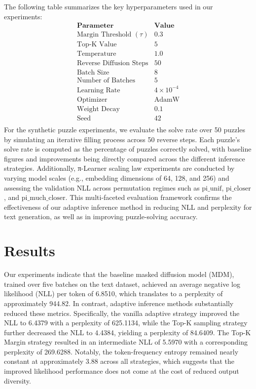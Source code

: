 \documentclass{article}
\begin{document}
The following table summarizes the key hyperparameters used in our experiments:
\[
\begin{array}{l|c}
\textbf{Parameter} & \textbf{Value} \\\hline
\text{Margin Threshold } (\tau) & 0.3 \\
\text{Top-K Value} & 5 \\
\text{Temperature} & 1.0 \\
\text{Reverse Diffusion Steps} & 50 \\
\text{Batch Size} & 8 \\
\text{Number of Batches} & 5 \\
\text{Learning Rate} & 4\times10^{-4} \\
\text{Optimizer} & \text{AdamW} \\
\text{Weight Decay} & 0.1 \\
\text{Seed} & 42 \\
\end{array}
\]
For the synthetic puzzle experiments, we evaluate the solve rate over 50 puzzles by simulating an iterative filling process across 50 reverse steps. Each puzzle’s solve rate is computed as the percentage of puzzles correctly solved, with baseline figures and improvements being directly compared across the different inference strategies. Additionally, π-Learner scaling law experiments are conducted by varying model scales (e.g., embedding dimensions of 64, 128, and 256) and assessing the validation NLL across permutation regimes such as \(\text{pi\_unif}\), \(\text{pi\_closer}\), and \(\text{pi\_much\_closer}\). This multi-faceted evaluation framework confirms the effectiveness of our adaptive inference method in reducing NLL and perplexity for text generation, as well as in improving puzzle-solving accuracy.

\section{Results}
Our experiments indicate that the baseline masked diffusion model (MDM), trained over five batches on the text dataset, achieved an average negative log likelihood (NLL) per token of 6.8510, which translates to a perplexity of approximately 944.82. In contrast, adaptive inference methods substantially reduced these metrics. Specifically, the vanilla adaptive strategy improved the NLL to 6.4379 with a perplexity of 625.1134, while the Top-K sampling strategy further decreased the NLL to 4.4384, yielding a perplexity of 84.6409. The Top-K Margin strategy resulted in an intermediate NLL of 5.5970 with a corresponding perplexity of 269.6288. Notably, the token-frequency entropy remained nearly constant at approximately 3.88 across all strategies, which suggests that the improved likelihood performance does not come at the cost of reduced output diversity.
\end{document}
